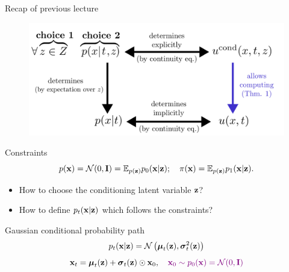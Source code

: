 \begin{frame}{Recap of previous lecture}
	\begin{figure}
		\centering
		\includegraphics[width=0.7\linewidth]{figs/cfm_uncond_to_cond}
	\end{figure}
	\vspace{-0.3cm}
	\begin{block}{Constraints}
		\vspace{-0.3cm}
		\[
			p(\mathbf{x}) = \mathcal{N}(0, \mathbf{I}) = \mathbb{E}_{p(\mathbf{z})} p_0(\mathbf{x} | \mathbf{z}); \quad \pi(\mathbf{x}) = \mathbb{E}_{p(\mathbf{z})} p_1(\mathbf{x} | \mathbf{z}).
		\]
		\vspace{-0.5cm}
	\end{block}
	\begin{itemize}
		\item How to choose the conditioning latent variable $\mathbf{z}$?
		\item How to define $p_t(\mathbf{x} | \mathbf{z})$ which follows the constraints?
	\end{itemize}
	\begin{block}{Gaussian conditional probability path}
		\vspace{-0.3cm}
		\[
			p_t(\mathbf{x} | \mathbf{z}) = \mathcal{N}\left(\boldsymbol{\mu}_t(\mathbf{z}), \boldsymbol{\sigma}_t^2(\mathbf{z})\right)
		\]
		\[
			\mathbf{x}_t = \boldsymbol{\mu}_t(\mathbf{z}) + \boldsymbol{\sigma}_t(\mathbf{z}) \odot \mathbf{x}_0, \quad {\color{violet} \mathbf{x}_0 \sim p_0(\mathbf{x}) = \mathcal{N}(0, \mathbf{I})}
		\]
	\end{block}
\end{frame}
